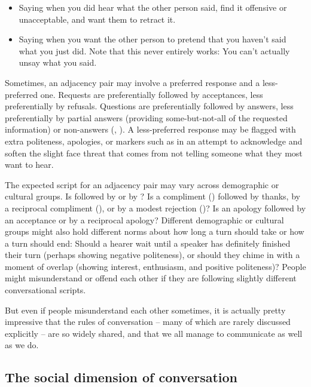 \begin{enumerate}
\begin{itemize}
\item Saying  when you did hear what the other person said, find it offensive or unacceptable, and want them to retract it.
\item Saying  when you want the other person to pretend that you haven't said what you just did. Note that this never entirely works: You can't actually unsay what you said.
\end{itemize}
\end{enumerate}


Sometimes, an adjacency pair may involve a preferred response and a less-preferred one.  Requests are preferentially followed by acceptances, less preferentially by refusals.  Questions are preferentially followed by answers, less preferentially by partial answers (providing some-but-not-all of the requested information) or  non-answers (, ).  A less-preferred response may be flagged  with extra politeness, apologies, or markers such as   in an attempt to acknowledge and soften the slight face threat that comes from not telling someone what they most want to hear.

The expected script for an adjacency pair may vary across demographic or cultural groups.  Is  followed by  or by ?  Is a compliment () followed by thanks, by a reciprocal compliment (), or by a modest rejection ()?  Is an apology followed by an acceptance or by a reciprocal apology?  Different demographic or cultural groups might also hold different norms about how long a turn should take or how a turn should end: Should a hearer wait until a speaker has definitely finished their turn (perhaps showing negative politeness), or should they chime in with a moment of overlap (showing interest, enthusiasm, and positive politeness)?  People might misunderstand or offend each other if they are following slightly different conversational scripts.

But even if people misunderstand each other sometimes, it is actually pretty impressive that the rules of conversation -- many of which are rarely discussed explicitly -- are so widely shared, and that we all manage to communicate as well as we do.

\subsection{The social dimension of conversation}


